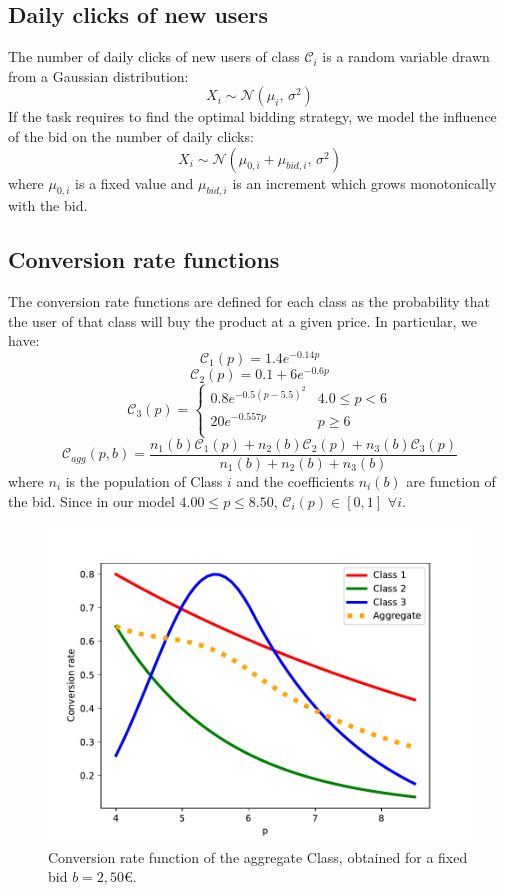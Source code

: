 \documentclass[12pt,a4paper]{report}
\begin{document}
			\subsection{Daily clicks of new users}
The number of daily clicks of new users of class $\mathcal C_i$ is a random variable drawn from a Gaussian distribution:
\[ X_i\sim \mathcal{N}(\mu_i,\,\sigma^{2})\]
If the task requires to find the optimal bidding strategy, we model the influence of the bid on the number of daily clicks:
\[ X_i \sim \mathcal{N}(\mu_{0,i}+\mu_{bid,i},\,\sigma^{2})\]
where $\mu_{0,i}$ is a fixed value and $\mu_{bid,i}$ is an increment which grows monotonically with the bid.

			\subsection{Conversion rate functions}
The conversion rate functions are defined for each class as the probability that the user of that class will buy the product at a given price. In particular, we have:
\[ \mathcal C_1(p) =  1.4 e^{-0.14p}    \]
\[ \mathcal C_2(p) = 0.1+ 6 e^{-0.6p}    \]
\[   \mathcal C_3(p) = \left\{
\begin{array}{ll}
      0.8 e^{-0.5(p-5.5)^2} & 4.0\leq p< 6 \\
      20 e^{-0.557p} & p \geq 6 \\
\end{array} 
\right. \]
\[ \mathcal C_{agg}(p, b) =\frac{n_1(b)\mathcal C_1(p)+n_2(b)\mathcal C_2(p)+n_3(b)\mathcal C_3(p)}{n_1(b)+n_2(b)+n_3(b)}\] 
where $n_i$ is the population of Class $i$ and the coefficients $n_i(b)$ are function of the bid.
Since in our model $4.00 \leq p \leq 8.50$, $\mathcal C_i(p) \in [0,1]$ $ \forall i$.
\begin{figure}[H]
\centering
  \includegraphics[scale = 0.8, center]{Cagg}
  \caption{Conversion rate function of the aggregate Class, obtained for a fixed bid $b=2,50$\euro.}
\end{figure}
\end{document}
